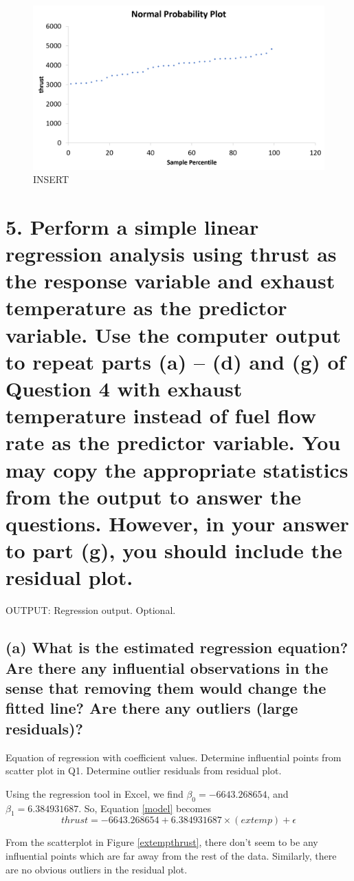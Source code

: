\documentclass[letterpaper]{article}
\begin{document}
\begin{figure}[H]
 \centering
 \includegraphics[width=\textwidth]{normalplot.png}
 \caption{INSERT}
\end{figure}

\section{5.	Perform a simple linear regression analysis using thrust as the response variable and exhaust temperature as the predictor variable. Use the computer output to repeat parts (a) – (d) and (g) of Question 4 with exhaust temperature instead of fuel flow rate as the predictor variable. You may copy the appropriate statistics from the output to answer the questions. However, in your answer to part (g), you should include the residual plot.}
OUTPUT: Regression output. Optional.

\subsection{(a)	What is the estimated regression equation? Are there any influential observations  in the sense that removing them would change the fitted line? Are there any outliers (large residuals)?}
Equation of regression with coefficient values. Determine
influential points from scatter plot in Q1. Determine outlier residuals from residual plot.

Using the regression tool in Excel, we find $\beta_0=-6643.268654$, and
$\beta_1=6.384931687$.
So, Equation \ref{model} becomes
$$ thrust = -6643.268654 + 6.384931687 \times (extemp) + \epsilon$$

From the scatterplot in Figure \ref{extempthrust}, there don't seem to be any
influential points which are far away from the rest of the data. Similarly, there
are no obvious outliers in the residual plot.
\end{document}
